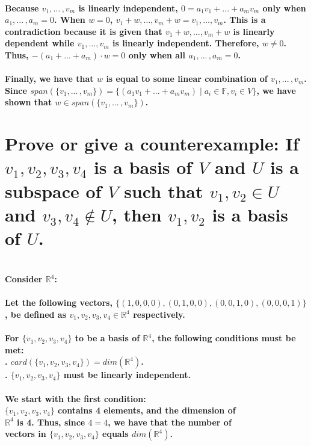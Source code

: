 \documentclass{article}
\begin{document}
\paragraph{\large
Because $v_1, ...\,, v_m$ is linearly independent, $0 = a_{1}v_{1} + ... + a_{m}v_{m}$ only when $a_1, ...\,, a_m = 0$. When $w = 0$, $v_1 + w, \ldots, v_m + w = v_1, \ldots, v_m$. This is a contradiction because it is given that $v_1 + w, \ldots, v_m + w$ is linearly dependent while $v_1,\ldots, v_m$ is linearly independent. Therefore, $w \neq 0$. Thus, $-(a_{1} + ... + a_{m}) \cdot w = 0$ only when all $a_1, ...\,, a_m = 0$.}

\paragraph{\large
Finally, we have that $w$ is equal to some linear combination of $v_1, ...\,, v_m$. Since $span(\{v_1, ...\,, v_m\}) = \{(a_{1}v_{1} + ... + a_{m}v_{m})\;|\;a_i \in \mathbb{F}, v_i \in V\}$, we have shown that $w \in span(\{v_1, ...\,, v_m\})$.}

\newpage

\section{Prove or give a counterexample: If $v_1,v_2,v_3,v_4$ is a basis of $V$ and $U$ is a subspace of $V$ such that $v_1, v_2 \in U$ and $v_3,v_4 \not \in U$, then $v_1,v_2$ is a basis of $U$.}

\paragraph{\large
\\Consider $\mathbb{R}^4$:
\\\\Let the following vectors, $\{(1,0,0,0), (0,1,0,0),(0,0,1,0),(0,0,0,1)\}$, be defined as $v_1,v_2,v_3,v_4 \in \mathbb{R}^4$ respectively.}

\paragraph{\large
For $\{v_1,v_2,v_3,v_4\}$ to be a basis of $\mathbb{R}^4$, the following conditions must be met:
\\. $card(\{v_1,v_2,v_3,v_4\}) = dim(\mathbb{R}^4)$.
\\. $\{v_1,v_2,v_3,v_4\}$ must be linearly independent.}

\paragraph{\large
We start with the first condition:
\\\indent $\{v_1,v_2,v_3,v_4\}$ contains 4 elements, and the dimension of \\\indent $\mathbb{R}^4$ is 4. Thus, since $4=4$, we have that the number of \\\indent vectors in $\{v_1,v_2,v_3,v_4\}$ equals $dim(\mathbb{R}^4)$.}
\end{document}
